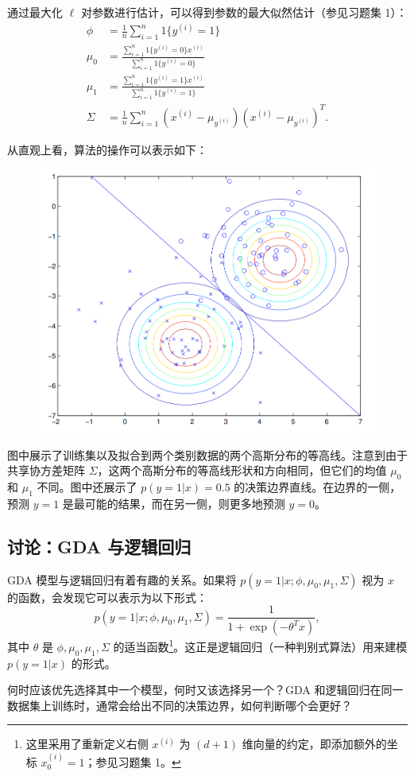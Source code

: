 通过最大化 $\ell$ 对参数进行估计，可以得到参数的最大似然估计（参见习题集 1）：
\[
\begin{aligned}
    \phi &= \frac{1}{n} \sum_{i=1}^n 1\{y^{(i)} = 1\} \\
    \mu_0 &= \frac{\sum_{i=1}^n 1\{y^{(i)} = 0\}x^{(i)}}{\sum_{i=1}^n 1\{y^{(i)} = 0\}} \\
    \mu_1 &= \frac{\sum_{i=1}^n 1\{y^{(i)} = 1\}x^{(i)}}{\sum_{i=1}^n 1\{y^{(i)} = 1\}} \\
    \Sigma &= \frac{1}{n} \sum_{i=1}^n (x^{(i)} - \mu_{y^{(i)}})(x^{(i)} - \mu_{y^{(i)}})^T.
\end{aligned}
\]

从直观上看，算法的操作可以表示如下：

\begin{figure}[H]
    \centering
    \includegraphics[width=0.5\linewidth]{figs/gda.png}
\end{figure}

图中展示了训练集以及拟合到两个类别数据的两个高斯分布的等高线。注意到由于共享协方差矩阵 $\Sigma$，这两个高斯分布的等高线形状和方向相同，但它们的均值 $\mu_0$ 和 $\mu_1$ 不同。图中还展示了 $p(y=1|x)=0.5$ 的决策边界直线。在边界的一侧，预测 $y=1$ 是最可能的结果，而在另一侧，则更多地预测 $y=0$。

\subsection{讨论：GDA 与逻辑回归}

GDA 模型与逻辑回归有着有趣的关系。如果将 $p(y=1|x; \phi, \mu_0, \mu_1, \Sigma)$ 视为 $x$ 的函数，会发现它可以表示为以下形式：
\[
    p(y=1|x; \phi, \mu_0, \mu_1, \Sigma) = \frac{1}{1+\exp(-\theta^T x)},
\]
其中 $\theta$ 是 $\phi, \mu_0, \mu_1, \Sigma$ 的适当函数\footnote{这里采用了重新定义右侧 $x^{(i)}$ 为 $(d+1)$ 维向量的约定，即添加额外的坐标 $x_0^{(i)} = 1$；参见习题集 1。}。这正是逻辑回归（一种判别式算法）用来建模 $p(y=1|x)$ 的形式。

何时应该优先选择其中一个模型，何时又该选择另一个？GDA 和逻辑回归在同一数据集上训练时，通常会给出不同的决策边界，如何判断哪个会更好？

